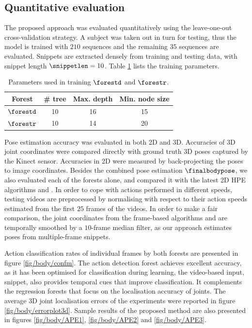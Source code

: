 \subsection{Quantitative evaluation}
\label{sec/body/quant}
The proposed approach was evaluated quantitatively using the leave-one-out cross-validation strategy. A subject was taken out in turn for testing, thus the model is trained with $210$ sequences and the remaining $35$ sequences are evaluated. 
Snippets are extracted densely from training and testing data, with snippet length $\snippetlen = 10$. 
Table \ref{tab/body/rf_train_params} lists the training parameters. 

\begin{table}
	\centering
	\begin{tabular}{|c|c|c|c|}
		\hline 
		Forest & \# tree & Max. depth & Min. node size \\ \hline 
		$\forestd$ & 10 & 16 & 15 \\ \hline 
		$\forestr$ & 10 & 14 & 20 \\ \hline 
	\end{tabular} 
	\caption{Parameters used in training $\forestd$ and $\forestr$.}
	\label{tab/body/rf_train_params}
\end{table}



Pose estimation accuracy was evaluated in both 2D and 3D. Accuracies of 3D joint coordinates were compared directly with ground truth 3D poses captured by the Kinect sensor. Accuracies in 2D were measured by back-projecting the poses to image coordinates.  
Besides the combined pose estimation $\finalbodypose$, we also evaluated each of the forests alone, and compared it with the latest 2D HPE algorithms \cite{Eichner2012} and \cite{Yang2011}. 
In order to cope with actions performed in different speeds, testing videos are preprocessed by normalising with respect to their action speeds estimated from the first $25$ frames of the videos.
In order to make a fair comparison, the joint coordinates from the frame-based algorithms \cite{Eichner2012} and \cite{Yang2011} are temporally smoothed by a $10$-frame median filter, as our approach estimates poses from multiple-frame snippets. 

Action classification rates of individual frames by both forests are presented in figure \ref{fig/body/confm}. 
The action detection forest achieves excellent accuracy, as it has been optimised for classification during learning, the video-based input, snippet, also provides temporal cues that improve classification. It complements the regression forests that focus on the localisation accuracy of joints.    
The average 3D joint localisation errors of the experiments were reported in figure \ref{fig/body/errorplot3d}. 
Sample results of the proposed method are also presented in figures \ref{fig/body/APE1}, \ref{fig/body/APE2} and \ref{fig/body/APE3}. 

